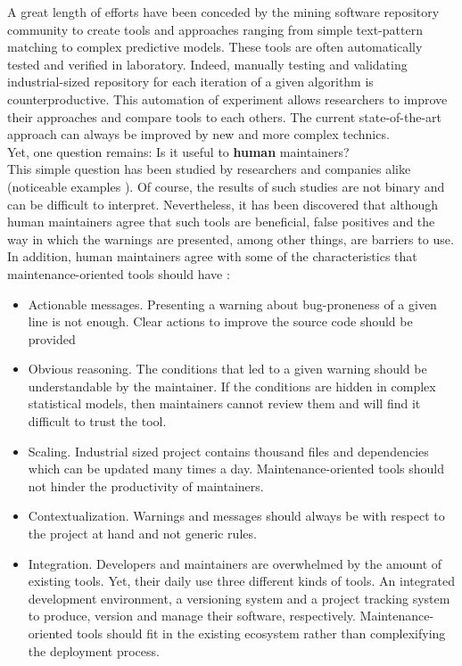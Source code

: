 A great length of efforts have been conceded by the mining software repository community to create tools and approaches ranging from simple text-pattern matching to complex predictive models.
These tools are often automatically tested and verified in laboratory\cite{Lewis2013}.
Indeed, manually testing and validating industrial-sized repository for each iteration of a given algorithm is counterproductive.
This automation of experiment allows researchers to improve their approaches and compare tools to each others.
The current state-of-the-art approach can always be improved by new and more complex technics\cite{Hovemeyer2004}.
\\
Yet, one question remains:  Is it useful to {\bf human} maintainers?
\\
This simple question has been studied by researchers and companies alike (noticeable examples \cite{Lewis2013,Foss2015,Layman2007,Ayewah2007,Ayewah2008,Johnson2013,Norman2013, Lopez2011}).
Of course, the results of such studies are not binary and can be difficult to interpret.
Nevertheless, it has been discovered that although human maintainers agree that such tools are beneficial, false positives and the way in which the warnings are presented, among other things, are barriers to use\cite{Johnson2013}.
In addition, human maintainers agree with some of the characteristics that maintenance-oriented tools should have \cite{Hovemeyer2004, Lopez2011, Lewis2013}:

\begin{itemize}
	\item Actionable messages. Presenting a warning about bug-proneness of a given line is not enough.
	Clear actions to improve the source code should be provided
	\item Obvious reasoning. The conditions that led to a given warning should be understandable by the maintainer.
	If the conditions are hidden in complex statistical models, then maintainers cannot review them and will find it difficult to trust the tool.
	\item Scaling. Industrial sized project contains thousand files and dependencies which can be updated many times a day.
	Maintenance-oriented tools should not hinder the productivity of maintainers.
	\item Contextualization. Warnings and messages should always be  with respect to the project at hand and not generic rules.
	\item Integration. Developers and maintainers are overwhelmed by the amount of existing tools.
	Yet, their daily use three different kinds of tools.
	An integrated development environment, a versioning system and a project tracking system to produce, version and manage their software, respectively.
	Maintenance-oriented tools should fit in the existing ecosystem rather than complexifying the deployment process.
\end{itemize}

